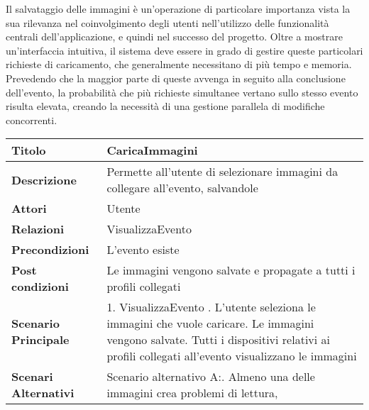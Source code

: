 Il salvataggio delle immagini è un'operazione di particolare importanza 
vista la sua rilevanza nel coinvolgimento degli utenti 
nell'utilizzo delle funzionalità centrali dell'applicazione, 
e quindi nel successo del progetto.
Oltre a mostrare un'interfaccia intuitiva, 
il sistema deve essere in grado di gestire queste particolari richieste di caricamento,
che generalmente necessitano di più tempo e memoria.
Prevedendo che la maggior parte di queste avvenga in seguito alla conclusione dell'evento,
la probabilità che più richieste simultanee vertano sullo stesso evento risulta elevata,
creando la necessità di una gestione parallela di modifiche concorrenti.\\

\begin{longtable} {|P{4.5cm}|P{11cm}|}
        \hline
        \textbf{Titolo}                   & CaricaImmagini                                                                  \\
        \hline
        \textbf{Descrizione}              & Permette all'utente di selezionare immagini da collegare all'evento, salvandole \\
        \hline
        \textbf{Attori}                   & Utente                                                                          \\
        \hline
        \textbf{Relazioni}                & VisualizzaEvento                                                                \\
        \hline
        \textbf{Precondizioni}            & L'evento esiste                                                                 \\
        \hline
        \textbf{Post condizioni}           & Le immagini vengono salvate e propagate a tutti i profili collegati             \\
        \hline
        \textbf{Scenario Principale}      & 1. VisualizzaEvento . L'utente seleziona le immagini che vuole caricare. Le immagini vengono salvate. Tutti i dispositivi relativi ai profili collegati all'evento visualizzano le immagini                            \\
        \hline
        \textbf{Scenari Alternativi}      &
        Scenario alternativo A:. Almeno una delle immagini crea problemi di lettura,

\end{longtable}
